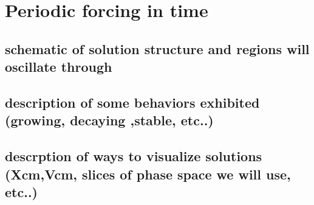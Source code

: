 \documentclass[../main/TimeForcingSHE.tex]{subfiles}
\begin{document}
\section{Periodic forcing in time }

\subsection{schematic of solution structure and regions will oscillate through}
\subsection{description of some behaviors exhibited (growing, decaying ,stable, etc..)}
\subsection{descrption of ways to visualize solutions (Xcm,Vcm, slices of phase space we will use, etc..)}
\end{document}
